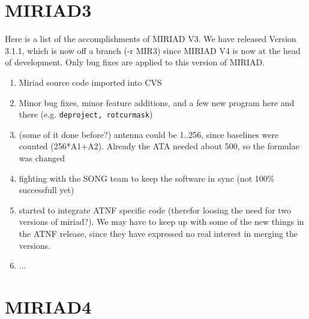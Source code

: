 \section{MIRIAD3}

Here is a list of the accomplishments of MIRIAD V3. We have
released Version 3.1.1, which is now off a branch (-r MIR3) since MIRIAD V4 is
now at the head of development. Only bug fixes are applied to this version
of MIRIAD.

\begin{enumerate}

\item
Miriad source code imported into CVS

\item
Minor bug fixes, minor feature additions,
and a few new program here and there (e.g. {\tt deproject, rotcurmask})

\item
(some of it done before?)
antenna could be 1..256, since baselines were counted (256*A1+A2).  Already the
ATA needed about 500, so the formulae was changed

\item
fighting with the SONG team to keep the software in sync (not 100\% successfull yet)

\item
started to integrate ATNF specific code (therefor loosing the need for two
versions of miriad?). We may have to keep up with some of the new things
in the ATNF release, since they have expressed no real interest in
merging the versions.

\item
...

\end{enumerate}


\section{MIRIAD4}

